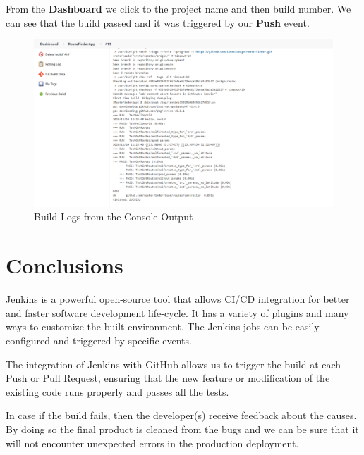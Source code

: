 \documentclass[12pt,a4paper,twoside]{article}
\begin{document}
From the \textbf{Dashboard} we click to the project name and then build number. We can see that the build passed and it was triggered by our \textbf{Push} event.

\begin{figure}[H]
    \centering
        \includegraphics[width=15cm]{images-aws/50-triggered-push-logs.png}
        \caption{Build Logs from the Console Output}
\end{figure}



\section{Conclusions}

Jenkins is a powerful open-source tool that allows CI/CD integration for better and faster software development life-cycle. It has a variety of plugins and many ways to customize the built environment. The Jenkins jobs can be easily configured and triggered by specific events. 

The integration of Jenkins with GitHub allows us to trigger the build at each Push or Pull Request, ensuring that the new feature or modification of the existing code runs properly and passes all the tests. 

In case if the build fails, then the developer(s) receive feedback about the causes. By doing so the final product is cleaned from the bugs and we can be sure that it will not encounter unexpected errors in the production deployment.


~\newpage
\end{document}
